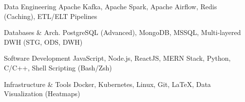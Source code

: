 
\begin{cvskills}

  \cvskill
    {Data Engineering} %
    {Apache Kafka, Apache Spark, Apache Airflow, Redis (Caching), ETL/ELT Pipelines} %

  \cvskill
    {Databases \& Arch.} %
    {PostgreSQL (Advanced), MongoDB, MSSQL, Multi-layered DWH (STG, ODS, DWH)} %

  \cvskill
    {Software Development} %
    {JavaScript, Node.js, ReactJS, MERN Stack, Python, C/C++, Shell Scripting (Bash/Zsh)} %

  \cvskill
    {Infrastructure \& Tools} %
    {Docker, Kubernetes, Linux, Git, LaTeX, Data Visualization (Heatmaps)} %

\end{cvskills}